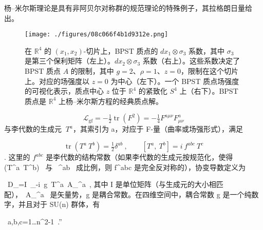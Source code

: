 杨–米尔斯理论是具有非阿贝尔对称群的规范理论的特殊例子，其拉格朗日量给出。
\begin{figure}[ht]
\centering
\texttt{[image: ./figures/08c066f4b1d9312e.png]}
\caption{在 \( \mathbb{R}^4 \) 的 \( (x_1, x_2) \)-切片上，BPST 质点的 \( dx_1 \otimes \sigma_3 \) 系数，其中 \( \sigma_3 \) 是第三个保利矩阵（左上）。\( dx_2 \otimes \sigma_3 \) 系数（右上）。这些系数决定了 BPST 质点 \( A \) 的限制，其中 \( g=2 \)、\( \rho=1 \)、\( z=0 \)，限制在这个切片上。对应的场强度以 \( z=0 \) 为中心（左下）。一个 BPST 质点场强度的可视化表示，质点中心 \( z \) 位于 \( \mathbb{R}^4 \) 的紧致化 \( S^4 \) 上（右下）。BPST 质点是 \( \mathbb{R}^4 \) 上杨–米尔斯方程的经典质点解。} \label{fig_Yang_1}
\end{figure}

\[\displaystyle \ {\mathcal {L}}_{\mathrm {gf} }=-{\tfrac {1}{2}}\operatorname {tr} (F^{2})=-{\tfrac {1}{4}}F^{a\mu \nu }F_{\mu \nu }^{a}~\] 
与李代数的生成元 \(\displaystyle \ T^{a}\)，其索引为 a，对应于 F-量（曲率或场强形式），满足

\[\displaystyle \ \operatorname {tr} \left(T^{a}\ T^{b}\right)={\tfrac {1}{2}}\delta ^{ab}\ ,\qquad \left[T^{a},\ T^{b}\right]=i\ f^{abc}\ T^{c}~\]. 
这里的 \(f^{abc}\) 是李代数的结构常数（如果李代数的生成元按规范化，使得 {\displaystyle \  (T^{a}\ T^{b})\ } 与 {\displaystyle \ \delta ^{ab}\ } 成比例，则 f^{abc} 是完全反对称的），协变导数定义为

{\displaystyle \ D_{\mu }=I\ \partial _{\mu }-i\ g\ T^{a}\ A_{\mu }^{a}\ ,}  
其中 I 是单位矩阵（与生成元的大小相匹配），{\displaystyle \ A_{\mu }^{a}\ } 是矢量势，g 是耦合常数。在四维空间中，耦合常数 g 是一个纯数字，并且对于 SU(n) 群体，有

{\displaystyle \ a,b,c=1\ldots n^{2}-1~.}”